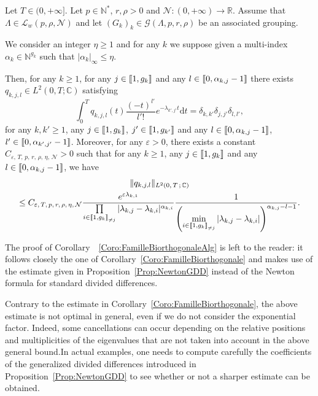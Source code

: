\documentclass[AHL,Unicode,longabstracts]{cedram}
\newcommand{\llbracket}{\mathopen{[\mkern -2.7mu[}}
\newcommand{\rrbracket}{\mathclose{]\mkern -2.7mu]}}
\newcommand{\inter}[2]{\llbracket #1,#2 \rrbracket}
\newcommand{\interexclu}[3]{\llbracket #1,#2\rrbracket_{\neq #3}}
\newcommand{\n}{g}
\newcommand{\LL}{\mathcal{L}}
\newcommand{\NN}{\mathcal{N}}
\newcommand{\N}{\mathbb{N}}
\newcommand{\R}{\mathbb{R}}
\newcommand{\C}{\mathbb{C}}
\newcommand{\md}{\mathrm{d}}
\begin{document}
\begin{coro} \label{Coro:FamilleBiorthogonaleAlg}
Let $T \in (0,+\infty]$. Let $p \in \N^*$, $r, \rho > 0$ and $\NN : (0,+\infty) \to \R$. Assume that $\Lambda \in \LL_w(p,\rho, \NN)$ and let $(G_k)_k\in \mathcal{G}(\Lambda,p,r,\rho)$ be an associated grouping.

We consider an integer $\eta \geq 1$ and for any $k$ we suppose given a multi-index $\alpha_k\in \N^{\n_k}$ such that $|\alpha_k|_\infty\leq \eta$.

Then, for any $k \geq 1$, for any $j \in \inter{1}{\n_k}$ and any $l \in \inter{0}{\alpha_{k,j}-1}$ there exists $q_{k,j,l} \in L^2(0,T ; \C)$ satisfying
\begin{equation*}\label{Famille_Biortho_Alg}
\int_0^T q_{k,j,l}(t) \frac{(-t)^{l'}}{l'!} e^{-\lambda_{k',j'} t } \md t = \delta_{k,k'} \delta_{j,j'} \delta_{l,l'},
\end{equation*}
for any $k, k' \geq 1$, any $j \in \inter{1}{\n_{k}}$, $j' \in \inter{1}{\n_{k'}}$ and any $l \in \inter{0}{\alpha_{k,j}-1}$, $l' \in \inter{0}{\alpha_{k',j'}-1}$. Moreover, for any $\varepsilon > 0$, there exists a constant $C_{\varepsilon,\,T,\, p,\, r,\, \rho,\, \eta,\,\NN} >0$ such that for any $k \geq 1$, any $j \in \inter{1}{\n_k}$ and any $l \in \inter{0}{\alpha_{k,j}-1}$, we have
\begin{multline*}\label{Estimee_Famille_Biortho_Alg}
\| q_{k,j,l} \|_{L^2(0,\,T\,;\,\C)} \\ \leq C_{\varepsilon,\,T, \,p,\, r,\, \rho,\, \eta,\, \NN} \frac{e^{\varepsilon \lambda_{k,1}}}{ \prod\limits_{i \in \interexclu{1}{\n_k}{j}} |\lambda_{k,j} - \lambda_{k,i}|^{\alpha_{k,i}}} \frac{1}{\left(\min\limits_{i\in\interexclu{1}{\n_k}{j}} |\lambda_{k,j}-\lambda_{k,i}|\right)^{\alpha_{k,j}-l-1}}.
\end{multline*}
\end{coro}


The proof of Corollary~~\ref{Coro:FamilleBiorthogonaleAlg} is left to the reader: it follows closely the one of Corollary~\ref{Coro:FamilleBiorthogonale} and makes use of the estimate given in Proposition~\ref{Prop:NewtonGDD} instead of the Newton formula for standard divided differences.

\begin{rema}
Contrary to the estimate in Corollary~\ref{Coro:FamilleBiorthogonale}, the above estimate is not optimal in general, even if we do not consider the exponential factor. Indeed, some cancellations can occur depending on the relative positions and multiplicities of the eigenvalues that are not taken into account in the above general bound.\linebreak In actual examples, one needs to compute carefully the coefficients of the generalized divided differences introduced in Proposition~\ref{Prop:NewtonGDD} to see whether or not a sharper estimate can be obtained.
\end{rema}
\end{document}
